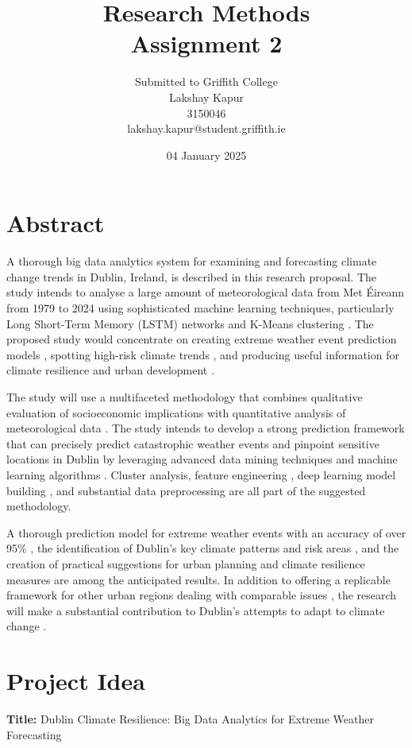 \documentclass[a4paper]{report}
\title{Research Methods \\ \vspace{2cm} \textbf{Assignment 2} \vspace{2cm}}
\author{Submitted to Griffith College \\ Lakshay Kapur \\ 3150046 \\ lakshay.kapur@student.griffith.ie\vspace{4cm}}
\date{04 January 2025}
\begin{document}
\maketitle

\section*{Abstract}
A thorough big data analytics system for examining and forecasting climate change trends in Dublin, Ireland, is described in this research proposal. The study intends to analyse a large amount of meteorological data from Met Éireann from 1979 to 2024 using sophisticated machine learning techniques, particularly Long Short-Term Memory (LSTM) networks \cite{chen2023} and K-Means clustering \cite{jackson2023}. The proposed study would concentrate on creating extreme weather event prediction models \cite{rodriguez2023}, spotting high-risk climate trends \cite{foster2024}, and producing useful information for climate resilience and urban development \cite{harris2024}.

The study will use a multifaceted methodology that combines qualitative evaluation of socioeconomic implications \cite{smith2024} with quantitative analysis of meteorological data \cite{evans2023}. The study intends to develop a strong prediction framework that can precisely predict catastrophic weather events \cite{rodriguez2023} and pinpoint sensitive locations in Dublin by leveraging advanced data mining techniques \cite{patel2024} and machine learning algorithms \cite{kumar2024}. Cluster analysis, feature engineering \cite{patel2024}, deep learning model building \cite{wang2023}, and substantial data preprocessing \cite{thompson2024} are all part of the suggested methodology.

A thorough prediction model for extreme weather events with an accuracy of over 95\% \cite{chen2023}
, the identification of Dublin's key climate patterns and risk areas \cite{foster2024}, and the creation of practical suggestions for urban planning and climate resilience measures \cite{mitchell2024} are among the anticipated results. In addition to offering a replicable framework for other urban regions dealing with comparable issues \cite{garcia2023}, the research will make a substantial contribution to Dublin's attempts to adapt to climate change \cite{murphy2023}.


\section*{Project Idea}
\textbf{Title:} Dublin Climate Resilience: Big Data Analytics for Extreme Weather Forecasting
\end{document}

